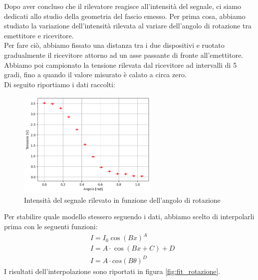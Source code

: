 \documentclass[letterpaper,12pt]{article}
\begin{document}
Dopo aver concluso che il rilevatore reagisce all'intensità del segnale, ci siamo dedicati allo studio della geometria
del fascio emesso. Per prima cosa, abbiamo studiato la variazione dell'intensità rilevata al variare dell'angolo di rotazione
tra emettitore e ricevitore.\\
Per fare ciò, abbiamo fissato una distanza tra i due dispositivi e ruotato gradualmente il ricevitore attorno ad un asse
passante di fronte all'emettitore. Abbiamo poi campionato la tensione rilevata dal ricevitore ad intervalli di 5 gradi, fino a quando
il valore misurato è calato a circa zero.\\
Di seguito riportiamo i dati raccolti:

\begin{figure}[h!]
    \centering
    \includegraphics[width = 0.6\textwidth]{dati_rotazione.png}
    \caption{Intensità del segnale rilevato in funzione dell'angolo di rotazione}
    \label{fig:rotazione}
\end{figure}

Per stabilire quale modello stessero seguendo i dati, abbiamo scelto di interpolarli prima con le seguenti funzioni:
\begin{align*}
    & I = I_0\cos(Bx)^A \\
    & I = A\cdot\cos(Bx + C) + D \\
    & I = A\cdot cos(B\theta)^D
\end{align*} 
I risultati dell'interpolazione sono riportati in figura \ref{fig:fit_rotazione}.
\end{document}
